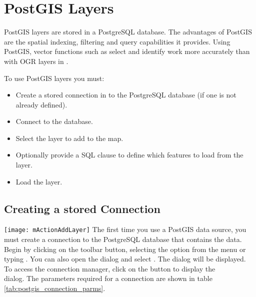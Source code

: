 \section{PostGIS Layers}
\label{label_postgis}

PostGIS layers are stored in a PostgreSQL database. The advantages of PostGIS
are the spatial indexing, filtering and query capabilities it provides. Using PostGIS,
vector functions such as select and identify work more accurately than with
OGR layers in \qg.

To use PostGIS layers you must:

\begin{itemize}[label=--]
\item Create a stored connection in \qg to the PostgreSQL database (if one is
not already defined).
\item Connect to the database.
\item Select the layer to add to the map.
\item Optionally provide a SQL 
clause to define which features
to load from the layer.
\item Load the layer.
\end{itemize}

\subsection{Creating a stored
Connection}\label{sec:postgis_stored}

\texttt{[image: mActionAddLayer]} The first time
you use a PostGIS data source, you must create a connection to the PostgreSQL
database that contains the data. Begin by clicking on the
 toolbar button, selecting the
 option from the
 menu or typing . You can also
open the  dialog and select .
The  dialog will
be displayed. To access the connection manager, click on the  button to display the \\
 dialog. The parameters required for
a connection are shown in table \ref{tab:postgis_connection_parms}.

